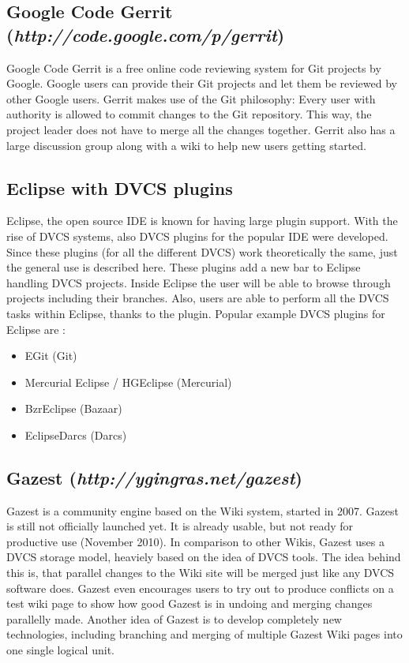 \subsection{Google Code Gerrit \\(\textit{http://code.google.com/p/gerrit})}

Google Code Gerrit is a free online code reviewing system for Git projects by Google. Google users can provide their Git projects and let them be reviewed by other Google users. Gerrit makes use of the Git philosophy: Every user with authority is allowed to commit changes to the Git repository. This way, the project leader does not have to merge all the changes together. Gerrit also has a large discussion group along with a wiki to help new users getting started. 

\subsection{Eclipse with DVCS plugins}

Eclipse, the open source IDE is known for having large plugin support. With the rise of DVCS systems, also DVCS plugins for the popular IDE were developed. Since these plugins (for all the different DVCS) work theoretically the same, just the general use is described here. These plugins add a new bar to Eclipse handling DVCS projects. Inside Eclipse the user will be able to browse through projects including their branches. Also, users are able to perform all the DVCS tasks within Eclipse, thanks to the plugin.
\newline
Popular example DVCS plugins for Eclipse are \cite{eclipseplugins}:

\begin{itemize}
	\item EGit (Git)
	\item Mercurial Eclipse / HGEclipse (Mercurial)
	\item BzrEclipse (Bazaar)
	\item EclipseDarcs (Darcs)
\end{itemize}

\subsection{Gazest (\textit{http://ygingras.net/gazest})}

Gazest is a community engine based on the Wiki system, started in 2007. Gazest is still not officially launched yet. It is already usable, but not ready for productive use (November 2010). In comparison to other Wikis, Gazest uses a DVCS storage model, heaviely based on the idea of DVCS tools. The idea behind this is, that parallel changes to the Wiki site will be merged just like any DVCS software does. Gazest even encourages users to try out to produce conflicts on a test wiki page to show how good Gazest is in undoing and merging changes parallelly made. Another idea of Gazest is to develop completely new technologies, including branching and merging of multiple Gazest Wiki pages into one single logical unit.
